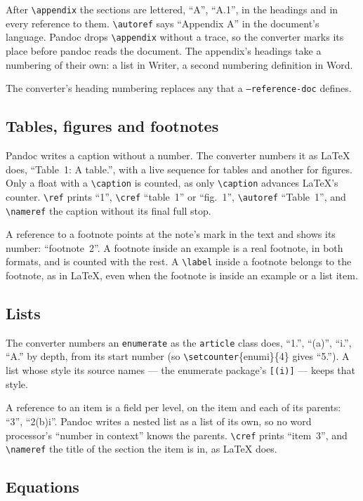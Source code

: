 \documentclass[11pt,a4paper]{article}
\newcommand{\cs}[1]{\texttt{\textbackslash #1}}
\newcommand{\opt}[1]{\texttt{#1}}
\newcommand{\pkg}[1]{\textsf{#1}}
\begin{document}
After \cs{appendix} the sections are lettered, ``A'', ``A.1'', in the headings
and in every reference to them. \cs{autoref} says ``Appendix A'' in the
document's language. Pandoc drops \cs{appendix} without a trace, so the
converter marks its place before pandoc reads the document. The appendix's
headings take a numbering of their own: a list in Writer, a second numbering
definition in Word.

The converter's heading numbering replaces any that a \opt{--reference-doc}
defines.

\subsection{Tables, figures and footnotes}

Pandoc writes a caption without a number. The converter numbers it as \LaTeX{}
does, ``Table~1: A table.'', with a live sequence for tables and another for
figures. Only a float with a \cs{caption} is counted, as only \cs{caption}
advances \LaTeX{}'s counter. \cs{ref} prints ``1'', \cs{cref} ``table~1'' or
``fig.~1'', \cs{autoref} ``Table~1'', and \cs{nameref} the caption without its
final full stop.

A reference to a footnote points at the note's mark in the text and shows its
number: ``footnote~2''. A footnote inside an example is a real footnote, in
both formats, and is counted with the rest. A \cs{label} inside a footnote
belongs to the footnote, as in \LaTeX, even when the footnote is inside an
example or a list item.

\subsection{Lists}

The converter numbers an \texttt{enumerate} as the \texttt{article} class
does, ``1.'', ``(a)'', ``i.'', ``A.'' by depth, from its start number (so
\cs{setcounter}\{enumi\}\{4\} gives ``5.''). A list whose style its source
names --- the \pkg{enumerate} package's \texttt{[(i)]} --- keeps that style.

A reference to an item is a field per level, on the item and each of its
parents: ``3'', ``2(b)i''. Pandoc writes a nested list as a list of its own,
so no word processor's ``number in context'' knows the parents. \cs{cref}
prints ``item~3'', and \cs{nameref} the title of the section the item is in,
as \LaTeX{} does.

\subsection{Equations}\label{sec:equations}
\end{document}

